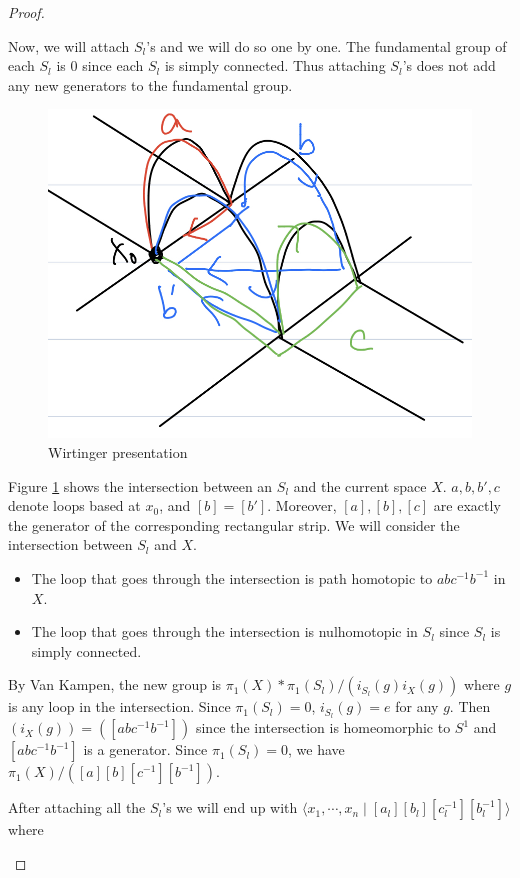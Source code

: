 \documentclass[12pt, psamsfonts]{amsart}
\theoremstyle{definition}
\theoremstyle{remark}
\numberwithin{equation}{section}
\begin{document}
\begin{proof}
\begin{itemize}
      Now, we will attach $S_l$'s and we will do so one by one.
      The fundamental group of each $S_l$ is $0$ since each $S_l$ is simply connected.
      Thus attaching $S_l$'s does not add any new generators to the fundamental group.
      \begin{figure}
        \includegraphics[width=.5\linewidth]{wirtinger.jpeg}
        \caption{Wirtinger presentation}
        \label{fig:wirtinger}
      \end{figure}
      Figure \ref{fig:wirtinger} shows the intersection between an $S_l$ and the current space $X$.
      $a, b, b', c$ denote loops based at $x_0$, and $[b] = [b']$.
      Moreover, $[a], [b], [c]$ are exactly the generator of the corresponding rectangular strip.
      We will consider the intersection between $S_l$ and $X$.
      \begin{itemize}
        \item
          The loop that goes through the intersection is path homotopic to $abc^{-1}b^{-1}$ in $X$.
        \item
          The loop that goes through the intersection is nulhomotopic in $S_l$ since $S_l$ is simply connected.
      \end{itemize}
      By Van Kampen, the new group is $\pi_1(X) * \pi_1(S_l) / (i_{S_l}(g)i_{X}(g))$ where $g$ is any loop in the intersection.
      Since $\pi_1(S_l) = 0$, $i_{S_l}(g) = e$ for any $g$.
      Then $(i_X(g)) = ([abc^{-1}b^{-1}])$ since the intersection is homeomorphic to $S^1$ and $[abc^{-1}b^{-1}]$ is a generator.
      Since $\pi_1(S_l) = 0$, we have $\pi_1(X) / ([a][b][c^{-1}][b^{-1}])$.

      After attaching all the $S_l$'s we will end up with $\langle x_1, \cdots, x_n \mid [a_l][b_l][c_l^{-1}][b_l^{-1}] \rangle$ where


\end{itemize}
\end{proof}
\end{document}
